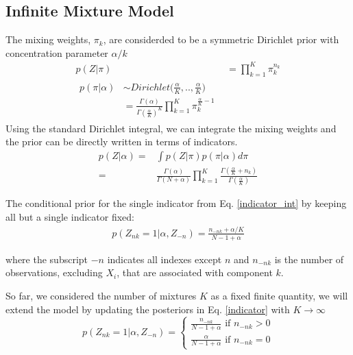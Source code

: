 \documentclass[letterpaper]{article}
\begin{document}
        \subsection{Infinite Mixture Model}
        The mixing weights, $\pi_k$, are considerded to be a symmetric Dirichlet prior with concentration parameter $\alpha/k$
        \begin{align}
                \label{z given pi}
                p(Z|\pi)&= \prod_{k=1}^{K}\pi_k^{n_k}
            \\
            \label{pi dirchlet}
            \begin{split}
                p(\pi|\alpha)&\sim Dirichlet\bigg(\frac{\alpha}{K},..,\frac{\alpha}{K}\bigg) \\
                &= \frac{\Gamma(\alpha)}{\Gamma(\frac{\alpha}{K})^K} \prod_{k=1}^K\pi_k^{\frac{\alpha}{K}-1}
            \end{split}
    \end{align}
        Using the standard Dirichlet integral, we can integrate the mixing weights and the prior can be directly written in terms of indicators.
        \begin{equation}
            \begin{split}
                p(Z|\alpha) =& \int p(Z|\pi) p(\pi|\alpha)d\pi \\
                =&\frac{\Gamma(\alpha)}{\Gamma(N+\alpha)} \prod_{k=1}^K \frac{\Gamma(\frac{\alpha}{K}+n_k)}{\Gamma(\frac{\alpha}{K})}
            \end{split}
            \label{indicator_int}
        \end{equation}
        
        The conditional prior for the single indicator from
        Eq. \ref{indicator_int} by keeping all but a single indicator fixed:
        \begin{equation}
            \begin{split}
                p(Z_{nk} = 1|\alpha, Z_{-n}) = \frac{n_{-nk} + \alpha/K}{N -1 +\alpha}
            \end{split}
            \label{indicator}
        \end{equation}
        
        where the subscript $-n$ indicates all indexes except $n$ and $n_{-nk}$ is the number of observations,
        excluding $X_i$, that are associated with component $k$.
        
        
        So far, we considered the number of mixtures $K$ as a fixed finite quantity, 
        we will extend the model by updating the posteriors in Eq. \ref{indicator} with $K\rightarrow \infty$
        \begin{equation}
            p(Z_{nk} = 1|\alpha, Z_{-n})= 
            \begin{cases}
                \frac{n_{-nk}}{N -1 +\alpha} \text{     if     } n_{-nk}>0\\ 
                \frac{\alpha}{N -1 +\alpha} \text{     if     } n_{-nk}=0
            \end{cases}
            \label{indicator_cases}
        \end{equation}
        
\end{document}

